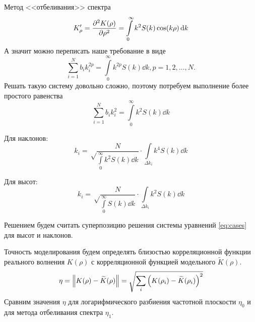 \begin{frame}[t]{}
\begin{columns}[t]
\begin{column}{.48\linewidth}
\begin{block}{Метод <<отбеливания>> спектра}
            \begin{equation}
                K'_{\rho}=\pdv[2]{K(\rho)}{\rho}=\int\limits_{0}^{\infty} k^2 S(k)\cos(k \rho)\dd{k}
            \end{equation}
            А значит можно переписать наше требование в виде
            \begin{equation}
                \sum_{i=1}^N b_i k_i^{2p}=\int\limits_{0}^{\infty} k^{2p}S(k)\dd{k}, p = 1,2,\dots,N.
            \end{equation}
            Решать такую систему довольно сложно, поэтому потребуем выполнение более простого равенства
            \begin{equation}
                \sum_{i=1}^N b_ik_i^{2}=\int\limits_{0}^{\infty} k^{2}S(k)\dd{k}
            \end{equation}
            \begin{minipage}{0.49\linewidth}
                \centering Для наклонов:
                \begin{equation}
                    k_i=\sqrt\frac{N}{{\int\limits_{0}^{\infty} k^2 S(k) \dd{k}}}\cdot {\int\limits_{\Delta k_i} k^4 S(k) \dd{k}}
                \end{equation}
                \end{minipage}
                \hfill
                \begin{minipage}{0.49\linewidth}
                \centering Для высот:
                \begin{equation}
                    k_i=\sqrt\frac{N}{{\int\limits_{0}^{\infty} S(k) \dd{k}}}\cdot \int\limits_{\Delta k_i} k^2 S(k) \dd{k}
                \end{equation}
                \end{minipage}
                \vfill
                Решением будем считать суперпозицию решения системы уравнений
                \eqref{eq:cases} для высот и наклонов.

                Точность моделирования будем определять близостью корреляционной функции реального волнения $K(\rho)$ с корреляционной функцией модельного $\widetilde K(\rho)$. 
                \begin{equation}
                    \label{eq:}
                    \eta = \norm{K(\rho) - \widetilde K(\rho)} = \sqrt{\sum\limits_i {\qty( K(\rho_i) - \widetilde K(\rho_i) )^2}}  
                \end{equation}
                Сравним значения $\eta$ для логарифмического разбиения частотной плоскости $\eta_0$ и для метода отбеливания спектра $\eta_1$.


\end{block}
\end{column}
\end{columns}
\end{frame}
